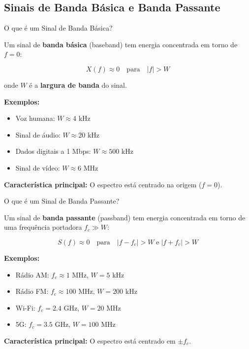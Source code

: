 
\subsection{Sinais de Banda Básica e Banda Passante}

\begin{frame}{O que é um Sinal de Banda Básica?}

Um sinal de \textbf{banda básica} (baseband) tem energia concentrada em torno de $f = 0$:

\[
X(f) \approx 0 \quad \text{para} \quad |f| > W
\]

onde $W$ é a \textbf{largura de banda} do sinal.

\vspace{0.2cm}

\textbf{Exemplos:}
\begin{itemize}
\item Voz humana: $W \approx 4$ kHz
\item Sinal de áudio: $W \approx 20$ kHz
\item Dados digitais a 1 Mbps: $W \approx 500$ kHz
\item Sinal de vídeo: $W \approx 6$ MHz
\end{itemize}

\textbf{Característica principal:} O espectro está centrado na origem ($f = 0$).

\end{frame}


\begin{frame}{O que é um Sinal de Banda Passante?}

Um sinal de \textbf{banda passante} (passband) tem energia concentrada em torno de uma frequência portadora $f_c \gg W$:

\[
S(f) \approx 0 \quad \text{para} \quad |f - f_c| > W \; \text{e} \; |f + f_c| > W
\]

\textbf{Exemplos:}
\begin{itemize}
\item Rádio AM: $f_c \approx 1$ MHz, $W = 5$ kHz
\item Rádio FM: $f_c \approx 100$ MHz, $W = 200$ kHz
\item Wi-Fi: $f_c = 2.4$ GHz, $W = 20$ MHz
\item 5G: $f_c = 3.5$ GHz, $W = 100$ MHz
\end{itemize}

\textbf{Característica principal:} O espectro está centrado em $\pm f_c$.

\end{frame}


